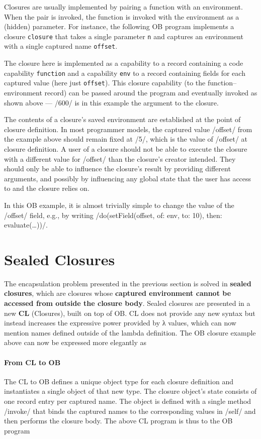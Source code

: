 \documentclass[main.tex]{subfiles}
\begin{document}
Closures are usually implemented by pairing a function with an environment. When the pair is invoked, the function is invoked with the environment as a (hidden) parameter. For instance, the following OB program implements a closure \texttt{closure} that takes a single parameter \texttt{n} and captures an environment with a single captured name \texttt{offset}.

The closure here is implemented as a capability to a record containing a code capability \texttt{function} and a capability \texttt{env} to a record containing fields for each captured value (here just \texttt{offset}). This closure capability (to the function–environment record) can be passed around the program and eventually invoked as shown above — \iil/600/ is in this example the argument to the closure.

The contents of a closure's saved environment are established at the point of closure definition. In most programmer models, the captured value \iil/offset/ from the example above should remain fixed at \iil/5/, which is the value of \iil/offset/ at closure definition. A user of a closure should not be able to execute the closure with a different value for \iil/offset/ than the closure's creator intended. They should only be able to influence the closure's result by providing different arguments, and possibly by influencing any global state that the user has access to and the closure relies on.

In this OB example, it is almost trivially simple to change the value of the \iil/offset/ field, e.g., by writing \iil/do(setField(offset, of: env, to: 10), then: evaluate(…))/.

\section{Sealed Closures} \label{sct:cls-sealed}
The encapsulation problem presented in the previous section is solved in \textbf{sealed closures}, which are closures whose \textbf{captured environment cannot be accessed from outside the closure body}. Sealed closures are presented in a new  \textbf{CL} (Closures), built on top of OB. CL does not provide any new syntax but instead increases the expressive power provided by λ values, which can now mention names defined outside of the lambda definition. The OB closure example above can now be expressed more elegantly as

\paragraph{From CL to OB} The CL to OB  defines a unique object type for each closure definition and instantiates a single object of that new type. The closure object's state consists of one record entry per captured name. The object is defined with a single method \iil/invoke/ that binds the captured names to the corresponding values in \iil/self/ and then performs the closure body. The above CL program is thus \lowered{} to the OB program
\end{document}
